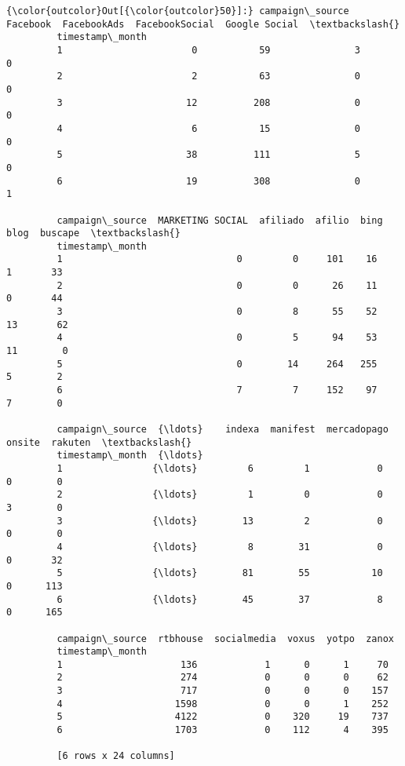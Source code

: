 \documentclass[11pt]{article}
\begin{document}
\begin{Verbatim}[commandchars=\\\{\}]
{\color{outcolor}Out[{\color{outcolor}50}]:} campaign\_source  Facebook  FacebookAds  FacebookSocial  Google Social  \textbackslash{}
         timestamp\_month                                                         
         1                       0           59               3              0   
         2                       2           63               0              0   
         3                      12          208               0              0   
         4                       6           15               0              0   
         5                      38          111               5              0   
         6                      19          308               0              1   
         
         campaign\_source  MARKETING SOCIAL  afiliado  afilio  bing  blog  buscape  \textbackslash{}
         timestamp\_month                                                            
         1                               0         0     101    16     1       33   
         2                               0         0      26    11     0       44   
         3                               0         8      55    52    13       62   
         4                               0         5      94    53    11        0   
         5                               0        14     264   255     5        2   
         6                               7         7     152    97     7        0   
         
         campaign\_source  {\ldots}    indexa  manifest  mercadopago  onsite  rakuten  \textbackslash{}
         timestamp\_month  {\ldots}                                                     
         1                {\ldots}         6         1            0       0        0   
         2                {\ldots}         1         0            0       3        0   
         3                {\ldots}        13         2            0       0        0   
         4                {\ldots}         8        31            0       0       32   
         5                {\ldots}        81        55           10       0      113   
         6                {\ldots}        45        37            8       0      165   
         
         campaign\_source  rtbhouse  socialmedia  voxus  yotpo  zanox  
         timestamp\_month                                              
         1                     136            1      0      1     70  
         2                     274            0      0      0     62  
         3                     717            0      0      0    157  
         4                    1598            0      0      1    252  
         5                    4122            0    320     19    737  
         6                    1703            0    112      4    395  
         
         [6 rows x 24 columns]
\end{Verbatim}
            
\end{document}
